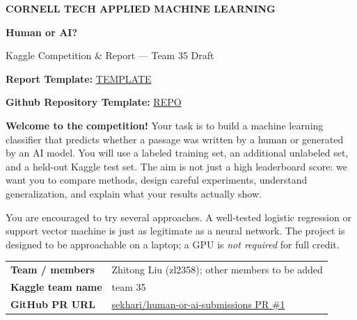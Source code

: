 \documentclass[11pt,letterpaper]{article}
\begin{document}
\thispagestyle{empty}
\vspace*{0.2in}
{\color{teal}\bfseries CORNELL TECH \textbar{} APPLIED MACHINE LEARNING}\par
\vspace{0.15in}
{\Huge\bfseries\color{navy} Human or AI?}\par
\vspace{0.07in}
{\LARGE\color{navy} Kaggle Competition \& Report --- Team 35 Draft}\par
\vspace{0.17in}

\textbf{Report Template: }\href{https://www.overleaf.com/project/6ae1fc85355dcf680137d898/share#f2777b20d3adeeecfac9096f78008e2f8daa0ff4be43de3b}{TEMPLATE}

\textbf{Github Repository Template: }\href{https://github.com/sekhari/human-or-ai-submissions}{REPO}

\textbf{Welcome to the competition!} Your task is to build a machine learning classifier that predicts whether a passage was written by a human or generated by an AI model. You will use a labeled training set, an additional unlabeled set, and a held-out Kaggle test set. The aim is not just a high leaderboard score: we want you to compare methods, design careful experiments, understand generalization, and explain what your results actually show.

You are encouraged to try several approaches. A well-tested logistic regression or support vector machine is just as legitimate as a neural network. The project is designed to be approachable on a laptop; a GPU is \emph{not required} for full credit.

\vspace{0.06in}
\begin{tabularx}{\linewidth}{@{}>{\bfseries}p{1.58in}Y@{}}
Team / members & Zhitong Liu (zl2358); other members to be added \\
Kaggle team name & team 35 \\
GitHub PR URL & \href{https://github.com/sekhari/human-or-ai-submissions/pull/1}{sekhari/human-or-ai-submissions PR \#1} \\
\end{tabularx}
\vspace{0.06in}
\end{document}
